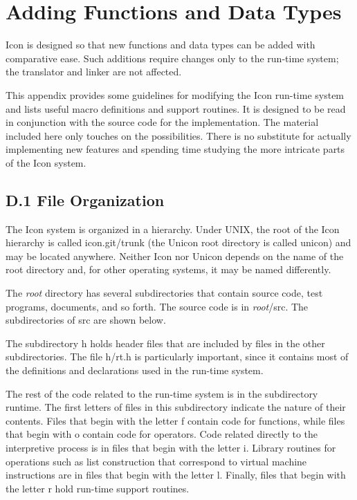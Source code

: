 \chapter{Adding Functions and Data Types}

Icon is designed so that new functions and data types can be added
with comparative ease. Such additions require changes only to the
run-time system; the translator and linker are not affected.


This appendix provides some guidelines for modifying the Icon run-time
system and lists useful macro definitions and support routines. It is
designed to be read in conjunction with the source code for the
implementation. The material included here only touches on the
possibilities. There is no substitute for actually implementing new
features and spending time studying the more intricate parts of the
Icon system.

\section{D.1 File Organization}

The Icon system is organized in a hierarchy. Under UNIX, the root of
the Icon hierarchy is called icon.git/trunk {\color{blue} (the Unicon
root directory is called unicon)} and may be located anywhere.
Neither Icon nor Unicon depends on the name of the root directory and,
for other operating systems, it may be named differently.

The {\it root} directory has several subdirectories that contain
source code, test programs, documents, and so forth. The source code
is in {\it root}/src.  The subdirectories of src are shown below.

The subdirectory h holds header files that are included by files in
the other subdirectories. The file h/rt.h is particularly important,
since it contains most of the definitions and declarations used in the
run-time system.

The rest of the code related to the run-time system is in the
subdirectory runtime. The first letters of files in this subdirectory
indicate the nature of their contents. Files that begin with the
letter f contain code for functions, while files that begin with o
contain code for operators. Code related directly to the interpretive
process is in files that begin with the letter
i. {\textquotedbl}Library{\textquotedbl} routines for operations such
as list construction that correspond to virtual machine instructions
are in files that begin with the letter l. Finally, files that begin
with the letter r hold run-time support routines.

